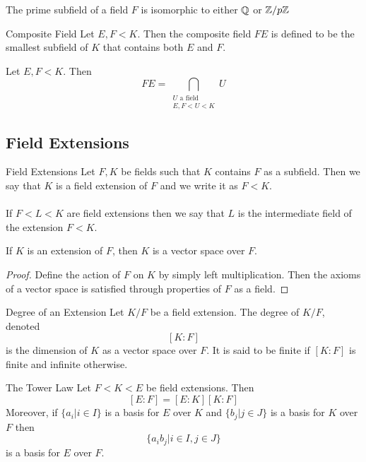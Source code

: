 \documentclass[a4paper]{article}
\begin{document}
\begin{prp}{}{} The prime subfield of a field $F$ is isomorphic to either $\mathbb{Q}$ or $\mathbb{Z}/p\mathbb{Z}$
\end{prp}

\begin{defn}{Composite Field}{} Let $E,F<K$. Then the composite field $FE$ is defined to be the smallest subfield of $K$ that contains both $E$ and $F$. 
\end{defn}

\begin{prp}{}{} Let $E,F<K$. Then $$FE=\bigcap_{\substack{U\text{ a field}\\E,F<U<K}}U$$
\end{prp}

\subsection{Field Extensions}
\begin{defn}{Field Extensions}{} Let $F,K$ be fields such that $K$ contains $F$ as a subfield. Then we say that $K$ is a field extension of $F$ and we write it as $F<K$. \\~\\
If $F<L<K$ are field extensions then we say that $L$ is the intermediate field of the extension $F<K$. 
\end{defn}

\begin{prp}{}{} If $K$ is an extension of $F$, then $K$ is a vector space over $F$. \tcbline
\begin{proof}
Define the action of $F$ on $K$ by simply left multiplication. Then the axioms of a vector space is satisfied through properties of $F$ as a field. 
\end{proof}
\end{prp}

\begin{defn}{Degree of an Extension}{} Let $K/F$ be a field extension. The degree of $K/F$, denoted $$[K:F]$$ is the dimension of $K$ as a vector space over $F$. It is said to be finite if $[K:F]$ is finite and infinite otherwise. 
\end{defn}

\begin{prp}{The Tower Law}{} Let $F<K<E$ be field extensions. Then $$[E:F]=[E:K][K:F]$$ Moreover, if $\{a_i|i\in I\}$ is a basis for $E$ over $K$ and $\{b_j|j\in J\}$ is a basis for $K$ over $F$ then $$\{a_ib_j|i\in I, j\in J\}$$ is a basis for $E$ over $F$. 
\end{prp}
\end{document}
